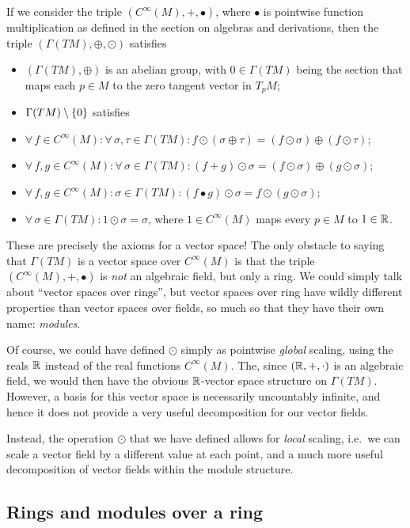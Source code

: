 If we consider the triple $(C^\infty(M),+,\bullet)$, where $\bullet$ is pointwise function multiplication as defined in the section on algebras and derivations, then the triple $(\Gamma(TM),\oplus,\odot)$ satisfies
\begin{itemize}
\item $(\Gamma(TM),\oplus)$ is an abelian group, with $0\in \Gamma(TM)$ being the section that maps each $p\in M$ to the zero tangent vector in $T_pM$;
\item $\Gamma(TM)\setminus\{0\}$ satisfies
\ben[label=\roman*)]
\item $\forall \, f \in C^\infty(M) : \forall \, \sigma,\tau \in \Gamma(TM) : f\odot(\sigma\oplus \tau)=(f\odot \sigma)\oplus (f\odot \tau)$;
\item $\forall \, f,g \in C^\infty(M) : \forall \,  \sigma \in \Gamma(TM): (f+g)\odot \sigma= (f \odot \sigma) \oplus (g \odot \sigma)$;
\item $\forall \, f,g \in C^\infty(M) :  \sigma \in \Gamma(TM) : (f\bullet g)\odot \sigma= f \odot (g \odot \sigma)$;
\item $\forall \, \sigma \in \Gamma(TM)  : 1 \odot \sigma = \sigma$,
\een
where $1\in C^\infty(M)$ maps every $p\in M$ to $1\in \mathbb{R}$.
\end{itemize}

These are precisely the axioms for a vector space! The only obstacle to saying that $\Gamma(TM)$ is a vector space over $C^\infty(M)$ is that the triple $(C^\infty(M),+,\bullet)$ is \emph{not} an algebraic field, but only a ring. We could simply talk about ``vector spaces over rings'', but vector spaces over ring have wildly different properties than vector spaces over fields, so much so that they have their own name: \emph{modules}.

\br
Of course, we could have defined $\odot$ simply as pointwise \emph{global} scaling, using the reals $\mathbb{R}$ instead of the real functions $C^\infty(M)$.
The, since $(\mathbb{R},+,\cdot)$ is an algebraic field, we would then have the obvious $\mathbb{R}$-vector space structure on $\Gamma(TM)$. However, a basis for this vector space is necessarily uncountably infinite, and hence it does not provide a very useful decomposition for our vector fields.

Instead, the operation $\odot$ that we have defined allows for \emph{local} scaling, i.e.\ we can scale a vector field by a different value at each point, and a much more useful decomposition of vector fields within the module structure.
\er


\subsection{Rings and modules over a ring}


